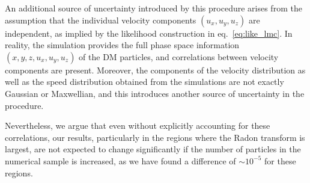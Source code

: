 \documentclass[a4paper,11pt]{article}
\begin{document}
An additional source of uncertainty introduced by this procedure arises from the assumption that the individual velocity components $(u_x, u_y, u_z)$ are independent, as implied by the likelihood construction in eq.~\eqref{eq:like_lmc}. In reality, the simulation provides the full phase space information $(x, y, z, u_x, u_y, u_z)$ of the DM particles, and correlations between velocity components are present. Moreover, the components of the velocity distribution as well as the speed distribution obtained from the simulations are not exactly Gaussian or Maxwellian, and this introduces another source of uncertainty in the procedure.

Nevertheless, we argue that even without explicitly accounting for these correlations, our results, particularly in the regions where the Radon transform is largest, are not expected to change significantly if the number of particles in the numerical sample is increased, as we have found a difference of $\sim 10^{-5}$ for these regions.



\typeout{}


\end{document}

